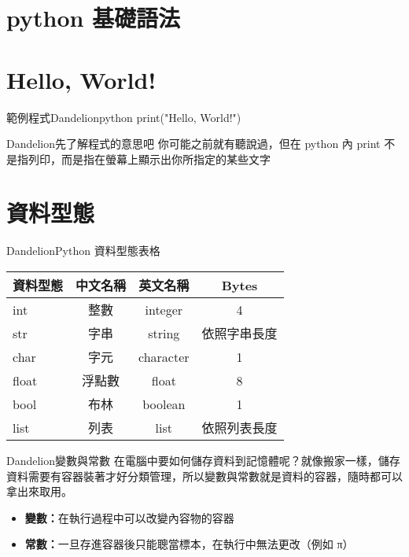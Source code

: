 \documentclass{article}
\begin{document}
\begin{large}
\section{python 基礎語法}
\section{Hello, World!}
\begin{mintbox}{範例程式}{Dandelion}{python}
print("Hello, World!")
\end{mintbox}

\begin{boxpar}{Dandelion}{先了解程式的意思吧}
    你可能之前就有聽說過，但在 python 內 print
    不是指列印，而是指在螢幕上顯示出你所指定的某些文字
\end{boxpar}
\section{資料型態}
\begin{colbox}{Dandelion}{Python 資料型態表格}
\begin{table}[]
\begin{tabular}{lccc}
    \hline
\multicolumn{1}{c}{資料型態} & 中文名稱 & 英文名稱      & Bytes  \\
\hline
int                      & 整數   & integer   & 4      \\
str                      & 字串   & string    & 依照字串長度 \\
char                     & 字元   & character & 1      \\
float                    & 浮點數 & float     & 8 \\
bool                     & 布林   & boolean   & 1 \\
list                     & 列表   & list      & 依照列表長度 \\
\hline
\end{tabular}
\end{table}
\end{colbox}
\begin{boxpar}{Dandelion}{變數與常數}
    在電腦中要如何儲存資料到記憶體呢？就像搬家一樣，儲存資料需要有容器裝著才好分類管理，所以變數與常數就是資料的容器，隨時都可以拿出來取用。
    \begin{itemize}
       \item \textbf{變數：}在執行過程中可以改變內容物的容器
       \item \textbf{常數：}一旦存進容器後只能聰當標本，在執行中無法更改（例如 π）
    \end{itemize}
\end{boxpar}


\end{large}
\end{document}
